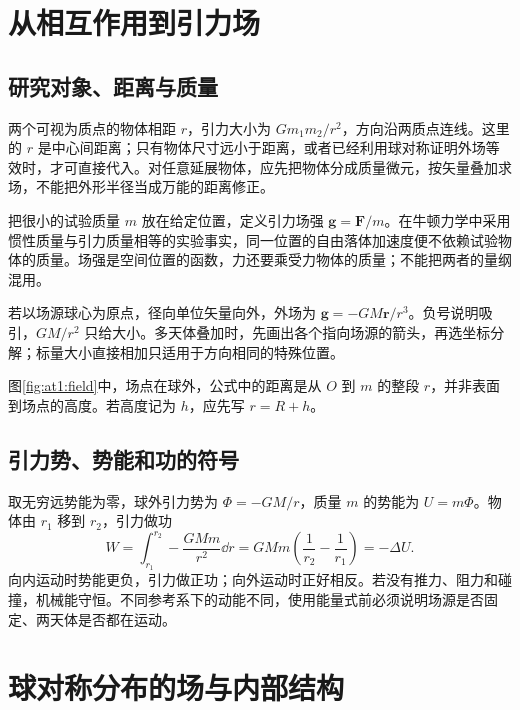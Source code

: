 \section{从相互作用到引力场}
\subsection{研究对象、距离与质量}

两个可视为质点的物体相距 $r$，引力大小为 $Gm_1m_2/r^2$，方向沿两质点连线。这里的 $r$ 是中心间距离；只有物体尺寸远小于距离，或者已经利用球对称证明外场等效时，才可直接代入。对任意延展物体，应先把物体分成质量微元，按矢量叠加求场，不能把外形半径当成万能的距离修正。

把很小的试验质量 $m$ 放在给定位置，定义引力场强 $\bm g=\bm F/m$。在牛顿力学中采用惯性质量与引力质量相等的实验事实，同一位置的自由落体加速度便不依赖试验物体的质量。场强是空间位置的函数，力还要乘受力物体的质量；不能把两者的量纲混用。

若以场源球心为原点，径向单位矢量向外，外场为 $\bm g=-GM\bm r/r^3$。负号说明吸引，$GM/r^2$ 只给大小。多天体叠加时，先画出各个指向场源的箭头，再选坐标分解；标量大小直接相加只适用于方向相同的特殊位置。

图\ref{fig:at1:field}中，场点在球外，公式中的距离是从 $O$ 到 $m$ 的整段 $r$，并非表面到场点的高度。若高度记为 $h$，应先写 $r=R+h$。\subsection{引力势、势能和功的符号}

取无穷远势能为零，球外引力势为 $\Phi=-GM/r$，质量 $m$ 的势能为 $U=m\Phi$。物体由 $r_1$ 移到 $r_2$，引力做功
\[
 W=\int_{r_1}^{r_2}-\frac{GMm}{r^2}\dd r
 =GMm\left(\frac1{r_2}-\frac1{r_1}\right)=-\Delta U.
\]
向内运动时势能更负，引力做正功；向外运动时正好相反。若没有推力、阻力和碰撞，机械能守恒。不同参考系下的动能不同，使用能量式前必须说明场源是否固定、两天体是否都在运动。


\section{球对称分布的场与内部结构}
